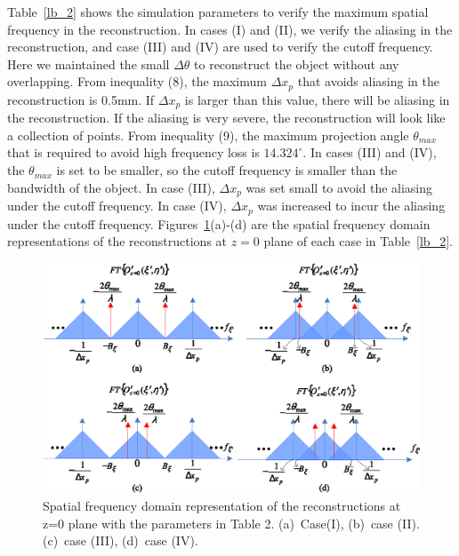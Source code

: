 \documentclass[10pt,letterpaper]{article}
\begin{document}
Table~\ref{lb_2} shows the simulation parameters to verify the maximum spatial frequency in the reconstruction. In cases (I) and (II), we verify the aliasing in the reconstruction, and case (III) and (IV) are used to verify the cutoff frequency. Here we maintained the small $\Delta\theta$ to reconstruct the object without any overlapping. From inequality (8), the maximum $\Delta x_p$ that avoids aliasing in the reconstruction is 0.5mm. If $\Delta x_p$ is larger than this value, there will be aliasing in the reconstruction. If the aliasing is very severe, the reconstruction will look like a collection of points. From inequality (9), the maximum projection angle $\theta_{max}$ that is required to avoid high frequency loss is $14.324^\circ$. In cases (III) and (IV), the $\theta_{max}$ is set to be smaller, so the cutoff frequency is smaller than the bandwidth of the object. In case (III), $\Delta x_p$ was set small to avoid the aliasing under the cutoff frequency. In case (IV), $\Delta x_p$ was increased to incur the aliasing under the cutoff frequency. Figures~\ref{fig_13}(a)-(d) are the spatial frequency domain representations of the reconstructions at $z=0$ plane of each case in Table~\ref{lb_2}.

\begin{figure}[htbp]
\centering\includegraphics[width=.7\columnwidth]{fig_13}
\caption{Spatial frequency domain representation of the reconstructions at z=0 plane with the parameters in Table 2. (a)~Case(I), (b)~case (II). (c)~case (III), (d)~case (IV).}
\label{fig_13}
\end{figure}
\end{document}
